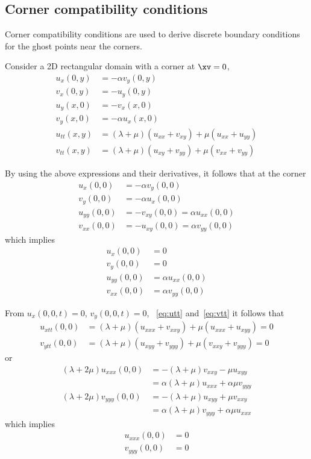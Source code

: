 \documentclass[11pt]{article}
\begin{document}
\clearpage
\subsection{Corner compatibility conditions}

Corner compatibility conditions are used to derive discrete boundary conditions for the
ghost points near the corners.

Consider a 2D rectangular domain with a corner at $\xv=0$,
\begin{align}
   u_x(0,y) &= - \alpha v_y(0,y) \\
   v_x(0,y) &= - u_y(0,y) \\
   u_y(x,0) &= -v_x(x,0) \\
   v_y(x,0) &= - \alpha u_x(x,0)  \\
   u_{tt}(x,y) &= (\lambda+\mu)(u_{xx} + v_{xy}) + \mu(u_{xx} + u_{yy}) \label{eq:utt} \\
   v_{tt}(x,y) &= (\lambda+\mu)(u_{xy} + v_{yy}) + \mu(v_{xx} + v_{yy}) \label{eq:vtt} 
\end{align}

By using the above expressions and their derivatives, it follows that at the corner
\begin{align}
   u_x(0,0) &= - \alpha v_y(0,0) \\
   v_y(0,0) &= - \alpha u_x(0,0) \\
   u_{yy}(0,0) &= - v_{xy}(0,0) = \alpha u_{xx}(0,0) \\
   v_{xx}(0,0)&=-u_{xy}(0,0) = \alpha v_{yy}(0,0) 
\end{align}
which implies 
\begin{align}
   u_x(0,0) &=0 \\
   v_y(0,0) &=0 \\
   u_{yy}(0,0) &= \alpha u_{xx}(0,0) \\
   v_{xx}(0,0) &= \alpha v_{yy}(0,0) 
\end{align}

From $u_x(0,0,t)=0$, $v_y(0,0,t)=0$, ~\eqref{eq:utt} and~\eqref{eq:vtt} it follows that
\begin{align}
   u_{xtt}(0,0) &= (\lambda+\mu)(u_{xxx} + v_{xxy}) + \mu(u_{xxx} + u_{xyy}) =0 \\
   v_{ytt}(0,0) &= (\lambda+\mu)(u_{xyy} + v_{yyy}) + \mu(v_{xxy} + v_{yyy}) =0
\end{align}
or
\begin{align}
   (\lambda+2\mu)u_{xxx}(0,0) &= -(\lambda+\mu)v_{xxy} - \mu u_{xyy} \\
                         &= \alpha(\lambda+\mu)u_{xxx} +\alpha\mu v_{yyy} \\
   (\lambda+2\mu)v_{yyy}(0,0) &= -(\lambda+\mu)u_{xyy}+\mu v_{xxy} \\
                         &= \alpha(\lambda+\mu)v_{yyy} + \alpha \mu u_{xxx}
\end{align}
which implies
\begin{align}
   u_{xxx}(0,0) &=0 \\
   v_{yyy}(0,0) &=0 
\end{align}
\end{document}
